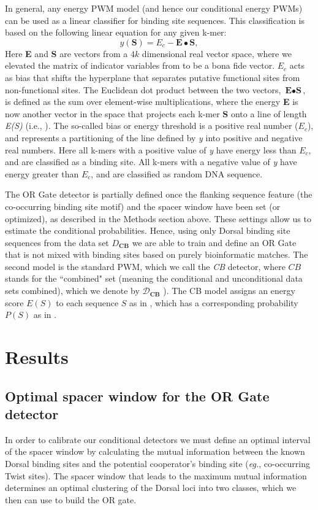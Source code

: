  In general, any energy PWM model (and hence our conditional energy PWMs) can be used as a linear classifier for binding site sequences.  This classification is based on the following linear equation for any given k-mer:
  \begin{equation}
   y(\textbf{S})=E_c - \textbf{E} \bullet \textbf{S},
   \end{equation}
  Here \textbf{E} and \textbf{S} are vectors from a $4k$ dimensional real vector space, where we elevated the matrix of indicator variables from  to be a bona fide vector. $E_c$ acts as bias that shifts the hyperplane that separates putative functional sites from non-functional sites.  The Euclidean dot product between the two vectors, $\textbf{E} \bullet \textbf{S}$, is defined as the sum over element-wise multiplications, where the energy \textbf{E} is now another vector in the space that projects each k-mer \textbf{S} onto a line of length \textit{E(S)} (i.e., ).  The so-called bias or energy threshold is a positive real number ($E_c$), and represents a partitioning of the line defined by \textit{y} into positive and negative real numbers.  Here all k-mers with a positive value of \textit{y} have energy less than $E_c$, and are classified as a binding site.  All k-mers with a negative value of \textit{y} have energy greater than $E_c$, and are classified as random DNA sequence.

The OR Gate detector is partially defined once the flanking sequence feature (the co-occurring binding site motif) and the spacer window have been set (or optimized), as described in the Methods section above.  These settings allow us to estimate the conditional probabilities.  
Hence, using only Dorsal binding site sequences from the data set $D_{\textbf{CB}}$ we are able to train and define an OR Gate that is not mixed with binding sites based on purely bioinformatic matches. 
The second model is the standard PWM, which we call the \textit{CB} detector, where $CB$ stands for the ``combined" set (meaning the conditional and unconditional data sets combined), which we denote by $\mathcal D_{\textbf{CB}}$ ).  The CB model assigns an energy score $E(S)$ to each sequence $S$ as in , which has a corresponding probability $P(S)$ as in .  



\section{Results}
	  \subsection{Optimal spacer window for the OR Gate detector}
In order to calibrate our conditional detectors we must define an optimal interval of the spacer window by calculating the mutual information between the known Dorsal binding sites and the potential cooperator's binding site (\textit{eg.}, co-occurring Twist sites).  The spacer window that leads to the maximum mutual information determines an optimal clustering of the Dorsal loci into two classes, which we then can use to build the OR gate.

